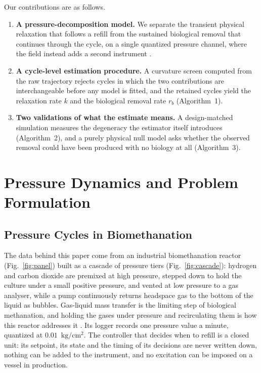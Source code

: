 \documentclass[sigconf]{acmart}
\newcommand{\pu}{\ensuremath{\mathrm{kg/cm^{2}}}}
\newcommand{\rb}{\ensuremath{r_{b}}}
\begin{document}
Our contributions are as follows.

\begin{enumerate}
\item \textbf{A pressure-decomposition model.} We separate the
transient physical relaxation that follows a refill from the sustained
biological removal that continues through the cycle, on a single
quantized pressure channel, where the field instead adds a second
instrument \cite{hafner2018quantification}.
\item \textbf{A cycle-level estimation procedure.} A curvature screen
computed from the raw trajectory rejects cycles in which the two contributions
are interchangeable before any model is fitted, and the retained cycles
yield the relaxation rate $k$ and the biological removal rate \rb{}
(Algorithm~1).
\item \textbf{Two validations of what the estimate means.} A
design-matched simulation measures the degeneracy the estimator itself
introduces (Algorithm~2), and a purely physical null model asks whether
the observed removal could have been produced with no biology at all
(Algorithm~3).
\end{enumerate}

\section{Pressure Dynamics and Problem Formulation}
\label{sec:dynamics}

\subsection{Pressure Cycles in Biomethanation}

The data behind this paper come from an industrial biomethanation
reactor (Fig.~\ref{fig:panel}) built as a cascade of pressure
tiers (Fig.~\ref{fig:cascade}):
hydrogen and carbon dioxide are premixed at high pressure, stepped down
to hold the culture under a small positive pressure, and vented at low
pressure to a gas analyser, while a pump continuously returns headspace
gas to the bottom of the liquid as bubbles. Gas-liquid mass transfer is
the limiting step of biological methanation, and holding the gases
under pressure and recirculating them is how this reactor addresses it
\cite{yoruklu2025comprehensive}. Its logger records one pressure value
a minute, quantized at $0.01$~\pu{}. The controller that decides when
to refill is a closed unit: its setpoint, its state and the timing of
its decisions are never written down, nothing can be added to the
instrument, and no excitation can be imposed on a vessel in production.
\end{document}
